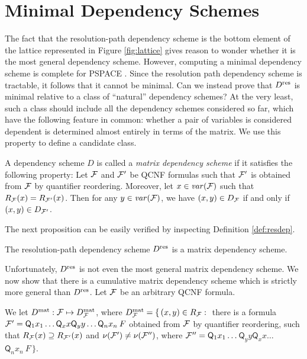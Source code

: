 \documentclass{llncs}
\newcommand{\Dres}{D^{\text{\normalfont res}}}
\newcommand{\Dmat}{D^{\text{\normalfont mat}}}
\def\hy{\hbox{-}\nobreak\hskip0pt} \newcommand{\ellipsis}{$\dots$}
\newcommand{\SB}{\{\,} \newcommand{\SM}{\;{:}\;} \newcommand{\SE}{\,\}}
\begin{document}
\section{Minimal Dependency Schemes}
The fact that the resolution\hy path dependency scheme is the bottom element
of the lattice represented in Figure \ref{fig:lattice} gives reason to wonder
whether it is the most general dependency scheme. However, computing a minimal
dependency scheme is complete for PSPACE \cite{SamerSzeider09a}. Since the
resolution path dependency scheme is tractable, it follows that it cannot be
minimal. Can we instead prove that $\Dres$ is minimal relative to a class of
``natural'' dependency schemes? At the very least, such a class should include
all the dependency schemes considered so far, which have the following feature
in common: whether a pair of variables is considered dependent is determined
almost entirely in terms of the matrix. We use this property to define a
candidate class.
\begin{definition} A dependency scheme $D$ is called a \emph{matrix dependency
    scheme} if it satisfies the following property: Let $\mathcal{F}$ and $\mathcal{F}'$ be
  QCNF formulas such that $\mathcal{F}'$ is obtained from $\mathcal{F}$ by quantifier
  reordering. Moreover, let $x \in \mathit{var}(\mathcal{F})$ such that $R_{\mathcal{F}}(x) =
  R_{\mathcal{F}'}(x)$. Then for any $y \in \mathit{var}(\mathcal{F})$, we have $(x,y) \in D_{\mathcal{F}}$
  if and only if $(x,y) \in D_{\mathcal{F}'}$.
\end{definition}
The next proposition can be easily verified by inspecting Definition
\ref{def:resdep}.
\begin{proposition}
  The resolution\hy path dependency scheme $\Dres$ is a matrix
  dependency scheme.
\end{proposition}
Unfortunately, $\Dres$ is not even the most general matrix dependency
scheme. We now show that there is a cumulative matrix dependency scheme which
is strictly more general than $\Dres$. Let $\mathcal{F}$ be an arbitrary QCNF
formula.
\begin{definition} We let $\Dmat: \FFF \mapsto \Dmat_{\FFF}$, where
  $\Dmat_{\FFF} = \SB (x,y) \in R_{\FFF} \SM$ there is a formula $\mathcal{F}' =
  \mathsf{Q}_1 x_1 \dots \mathsf{Q}_x x \mathsf{Q}_y y \dots \mathsf{Q}_n
  x_n\:F$ obtained from $\mathcal{F}$ by quantifier reordering, such that
  $R_{\mathcal{F}}(x) \supseteq R_{\mathcal{F}'}(x)$ and $\nu(\mathcal{F}') \neq \nu(\mathcal{F}'')$,
  where $\mathcal{F}''= \mathsf{Q}_1 x_1 \dots$\hskip 0pt$ \mathsf{Q}_y y
  \mathsf{Q}_x x \dots$\hskip 0pt$ \mathsf{Q}_n x_n\:F \SE$.
\end{definition}
\end{document}
